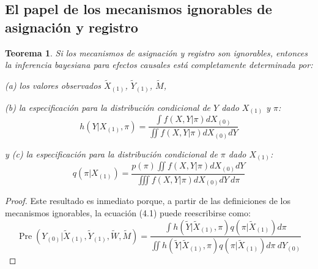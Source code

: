 \documentclass[12pt,a4paper]{article}
\newtheorem{theorem}{Teorema}
\begin{document}
\subsection{El papel de los mecanismos ignorables de asignación y registro} %

\begin{theorem}
Si los mecanismos de asignación y registro son ignorables, entonces la inferencia bayesiana para efectos causales está completamente determinada por: %

(a) los valores observados $\tilde{X}_{(1)}$, $\tilde{Y}_{(1)}$, $\tilde{M}$, %

(b) la especificación para la distribución condicional de $Y$ dado $X_{(1)}$ y $\pi$: %
\begin{equation}\label{eq:4.2}
h(Y|X_{(1)},\pi) = \frac{\int f(X,Y|\pi)dX_{(0)}}{\iint f(X,Y|\pi)dX_{(0)}dY} \tag{4.2}
\end{equation} %

y (c) la especificación para la distribución condicional de $\pi$ dado $X_{(1)}$: %
\begin{equation}\label{eq:4.3}
q(\pi|X_{(1)}) = \frac{p(\pi)\iint f(X,Y|\pi)dX_{(0)}dY}{\iiint f(X,Y|\pi)dX_{(0)}dY~d\pi} \tag{4.3}
\end{equation} %
\end{theorem}

\begin{proof}
Este resultado es inmediato porque, a partir de las definiciones de los mecanismos ignorables, la ecuación (4.1) puede reescribirse como: %
\begin{equation}\label{eq:4.4}
\operatorname{Pre}(Y_{(0)}|\tilde{X}_{(1)},\tilde{Y}_{(1)},\tilde{W},\tilde{M}) = \frac{\int h(\tilde{Y}|\tilde{X}_{(1)},\pi)q(\pi|\tilde{X}_{(1)})d\pi}{\iint h(\tilde{Y}|\tilde{X}_{(1)},\pi)q(\pi|\tilde{X}_{(1)})d\pi~dY_{(0)}} \tag{4.4}
\end{equation} %
\end{proof}
\end{document}
